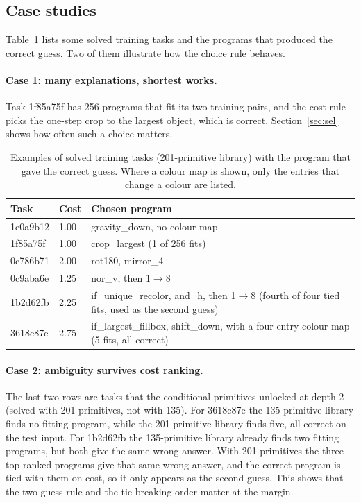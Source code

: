 \documentclass[sigconf,nonacm]{acmart}
\begin{document}
\subsection{Case studies}

Table~\ref{tab:examples} lists some solved training tasks and the programs that produced the correct guess. Two of them illustrate how the choice rule behaves.\paragraph{Case 1: many explanations, shortest works.} Task 1f85a75f has 256 programs that fit its two training pairs, and the cost rule picks the one-step crop to the largest object, which is correct. Section~\ref{sec:sel} shows how often such a choice matters.

\begin{table}[t]
\caption{Examples of solved training tasks (201-primitive library) with the program that gave the correct guess. Where a colour map is shown, only the entries that change a colour are listed.}
\label{tab:examples}
\footnotesize\setlength{\tabcolsep}{4pt}
\begin{tabular}{@{}ll>{\raggedright\arraybackslash}p{3.4cm}@{}}
\toprule
Task & Cost & Chosen program \\
\midrule
1e0a9b12 & 1.00 & gravity\_down, no colour map \\
1f85a75f & 1.00 & crop\_largest (1 of 256 fits) \\
0c786b71 & 2.00 & rot180, mirror\_4 \\
0c9aba6e & 1.25 & nor\_v, then 1$\to$8 \\
1b2d62fb & 2.25 & if\_unique\_recolor, and\_h, then 1$\to$8 (fourth of four tied fits, used as the second guess) \\
3618c87e & 2.75 & if\_largest\_fillbox, shift\_down, with a four-entry colour map (5 fits, all correct) \\
\bottomrule
\end{tabular}
\end{table}

\paragraph{Case 2: ambiguity survives cost ranking.} The last two rows are tasks that the conditional primitives unlocked at depth 2 (solved with 201 primitives, not with 135). For 3618c87e the 135-primitive library finds no fitting program, while the 201-primitive library finds five, all correct on the test input. For 1b2d62fb the 135-primitive library already finds two fitting programs, but both give the same wrong answer. With 201 primitives the three top-ranked programs give that same wrong answer, and the correct program is tied with them on cost, so it only appears as the second guess. This shows that the two-guess rule and the tie-breaking order matter at the margin.
\end{document}
